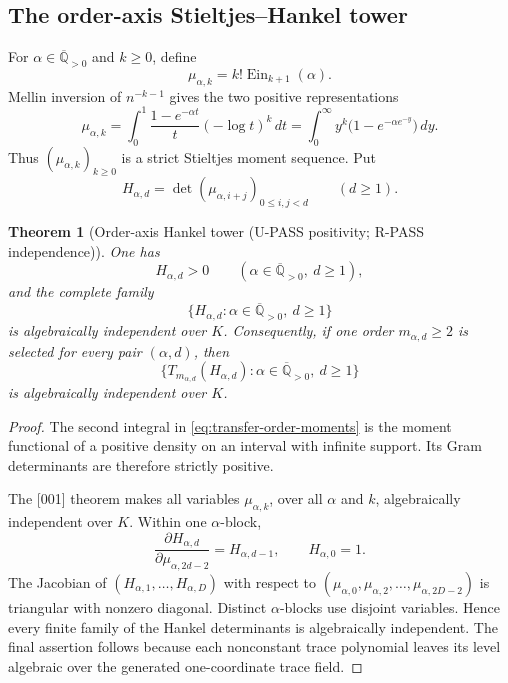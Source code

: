 \documentclass[11pt]{article}
\theoremstyle{keio}
\newtheorem{theorem}{Theorem}[section]
\theoremstyle{definition}
\theoremstyle{remark}
\newcommand{\Qbar}{\overline{\mathbb Q}}
\newcommand{\Ein}{\operatorname{Ein}}
\newcommand{\UPASS}{\textcolor{keiogreen}{\textsf{U-PASS}}}
\newcommand{\RPASS}{\textcolor{keioxblue}{\textsf{R-PASS}}}
\begin{document}
\subsection{The order-axis Stieltjes--Hankel tower}

For \(\alpha\in\Qbar_{>0}\) and \(k\ge0\), define
\[
 \mu_{\alpha,k}=k!\Ein_{k+1}(\alpha).
\]
Mellin inversion of \(n^{-k-1}\) gives the two positive representations
\begin{equation}
\label{eq:transfer-order-moments}
 \mu_{\alpha,k}
 =\int_0^1\frac{1-e^{-\alpha t}}{t}(-\log t)^k\,dt
 =\int_0^\infty y^k\bigl(1-e^{-\alpha e^{-y}}\bigr)\,dy.
\end{equation}
Thus \((\mu_{\alpha,k})_{k\ge0}\) is a strict Stieltjes moment sequence.
Put
\[
 H_{\alpha,d}=\det(\mu_{\alpha,i+j})_{0\le i,j<d}
 \qquad(d\ge1).
\]

\begin{theorem}[Order-axis Hankel tower (\UPASS{} positivity;
\RPASS{} independence)]
\label{thm:transfer-order-hankel}
One has
\[
 H_{\alpha,d}>0
 \qquad(\alpha\in\Qbar_{>0},\ d\ge1),
\]
and the complete family
\[
 \{H_{\alpha,d}:\alpha\in\Qbar_{>0},\ d\ge1\}
\]
is algebraically independent over \(K\).  Consequently, if one order
\(m_{\alpha,d}\ge2\) is selected for every pair \((\alpha,d)\), then
\[
 \{T_{m_{\alpha,d}}(H_{\alpha,d}):
   \alpha\in\Qbar_{>0},\ d\ge1\}
\]
is algebraically independent over \(K\).
\end{theorem}

\begin{proof}
The second integral in \eqref{eq:transfer-order-moments} is the moment
functional of a positive density on an interval with infinite support.
Its Gram determinants are therefore strictly positive.

The [001] theorem makes all variables \(\mu_{\alpha,k}\), over all
\(\alpha\) and \(k\), algebraically independent over \(K\).  Within one
\(\alpha\)-block,
\[
 \frac{\partial H_{\alpha,d}}
      {\partial\mu_{\alpha,2d-2}}=H_{\alpha,d-1},
 \qquad H_{\alpha,0}=1.
\]
The Jacobian of \((H_{\alpha,1},\ldots,H_{\alpha,D})\) with respect to
\((\mu_{\alpha,0},\mu_{\alpha,2},\ldots,
\mu_{\alpha,2D-2})\) is triangular with nonzero diagonal.  Distinct
\(\alpha\)-blocks use disjoint variables.  Hence every finite family of
the Hankel determinants is algebraically independent.  The final assertion
follows because each nonconstant trace polynomial leaves its level algebraic
over the generated one-coordinate trace field.
\end{proof}
\end{document}
